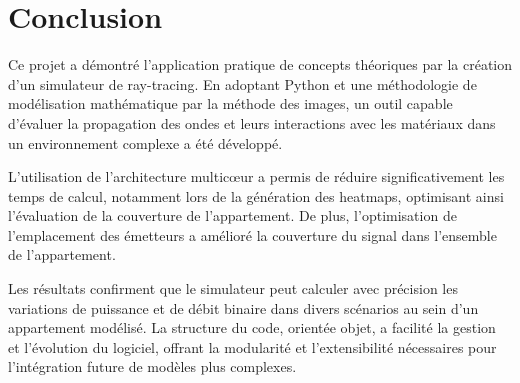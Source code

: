 \section{Conclusion}

Ce projet a démontré l'application pratique de concepts théoriques par la création d'un simulateur de ray-tracing. En adoptant Python et une méthodologie de modélisation mathématique par la méthode des images, un outil capable d’évaluer la propagation des ondes et leurs interactions avec les matériaux dans un environnement complexe a été développé.

L'utilisation de l'architecture multicœur a permis de réduire significativement les temps de calcul, notamment lors de la génération des heatmaps, optimisant ainsi l'évaluation de la couverture de l'appartement. De plus, l'optimisation de l'emplacement des émetteurs a amélioré la couverture du signal dans l'ensemble de l'appartement.

Les résultats confirment que le simulateur peut calculer avec précision les variations de puissance et de débit binaire dans divers scénarios au sein d'un appartement modélisé. La structure du code, orientée objet, a facilité la gestion et l'évolution du logiciel, offrant la modularité et l'extensibilité nécessaires pour l'intégration future de modèles plus complexes.
